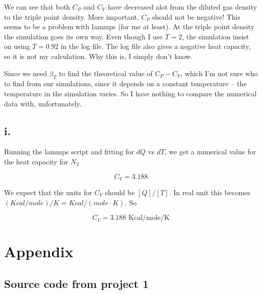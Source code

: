 \documentclass{article}
\begin{document}

We can see that both $C_P$ and $C_V$ have decreased alot from the diluted gas density to the triple point density. More important, $C_P$ should not be negative! This seems to be a problem with lammps (for me at least). At the triple point density the simulation goes its own way. Even though I use $T=2$, the simulation insist on using $T=0.92$ in the log file. The log file also gives a negative heat capacity, so it is not my calculation. Why this is, I simply don't know.

Since we need $\beta_T$ to find the theoretical value of $C_P - C_V$, which I'm not sure who to find from our simulations, since it depends on a constant temperature -- the temperature in the simulation varies. So I have nothing to compare the numerical data with, unfortunately.

\subsection*{i.}
Running the lammps script and fitting for $dQ$ vs $dT$, we get a numerical value for the heat capacity for $N_2$

\begin{equation}
C_V = 3.188
\end{equation}

We expect that the units for $C_V$ should be $[Q]/[T]$. In real unit this becomes $(Kcal/mole)/K = Kcal/(mole\cdot K)$. So

\begin{equation}
C_V = 3.188 \text{ Kcal/mole/K}
\end{equation}


\section*{Appendix}

\subsection*{Source code from project 1}
\end{document}
